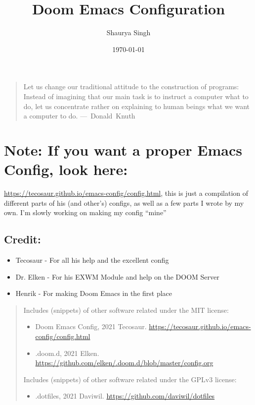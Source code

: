 \documentclass{scrartcl}
\author{Shaurya Singh}
\date{\today}
\title{Doom Emacs Configuration}
\begin{document}
\maketitle
\tableofcontents

\begin{quote}
Let us change our traditional attitude to the construction of programs:
Instead of imagining that our main task is to instruct a computer what to do,
let us concentrate rather on explaining to human beings what we want a
computer to do. \mbox{--- Donald Knuth}
\end{quote}

\section{\textbf{Note:} If you want a proper Emacs Config, look here:}
\label{sec:org3bcd5d1}
\url{https://tecosaur.github.io/emacs-config/config.html}, this is just a compilation
of different parts of his (and other's) configs, as well as a few parts I wrote
by my own. I'm slowly working on making my config ``mine''

\subsection{Credit:}
\label{sec:org44c8234}
\begin{itemize}
\item Tecosaur - For all his help and the excellent config
\item Dr. Elken - For his EXWM Module and help on the DOOM Server
\item Henrik - For making Doom Emacs in the first place
\end{itemize}

\begin{quote}
Includes (snippets) of other software related under the MIT license:
\begin{itemize}
\item Doom Emacs Config, 2021 Tecosaur. \url{https://tecosaur.github.io/emacs-config/config.html}
\item .doom.d, 2021 Elken. \url{https://github.com/elken/.doom.d/blob/master/config.org}
\end{itemize}

Includes (snippets) of other software related under the GPLv3 license:
\begin{itemize}
\item .dotfiles, 2021 Daviwil. \url{https://github.com/daviwil/dotfiles}
\end{itemize}
\end{quote}
\end{document}
